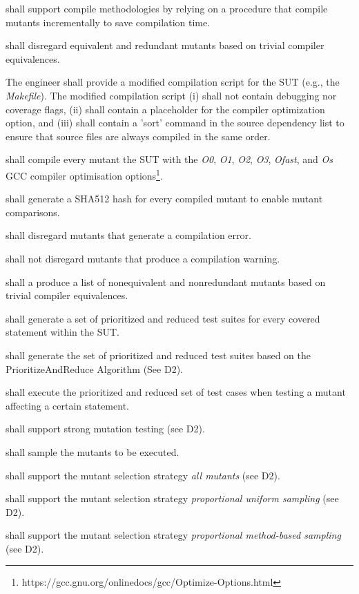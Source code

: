 \RQ{} \FAQAS shall support compile methodologies by relying on a procedure that compile mutants incrementally to save compilation time.

\RQ{} \FAQAS shall disregard equivalent and redundant mutants based on trivial compiler equivalences.

\RQ{} The engineer shall provide a modified compilation script for the SUT (e.g., the \emph{Makefile}). The modified compilation script (i) shall not contain debugging nor coverage flags, (ii) shall contain a placeholder for the compiler optimization option, and (iii) shall contain a 'sort' command in the source dependency list to ensure that source files are always compiled in the same order.

\RQ{} \FAQAS shall compile every mutant the SUT with the \textit{O0}, \textit{O1}, \textit{O2}, \textit{O3}, \textit{Ofast}, and \textit{Os} GCC compiler optimisation options\footnote{https://gcc.gnu.org/onlinedocs/gcc/Optimize-Options.html}.

\RQ{} \FAQAS shall generate a SHA512 hash for every compiled mutant to enable mutant comparisons. 

\RQ{} \FAQAS shall disregard mutants that generate a compilation error.

\RQ{} \FAQAS shall not disregard mutants that produce a compilation warning.

\RQ{} \FAQAS shall a produce a list of nonequivalent and nonredundant mutants based on trivial compiler equivalences. 

\RQ{} \FAQAS shall generate a set of prioritized and reduced test suites for every covered statement within the SUT.

\RQ{} \FAQAS shall generate the set of prioritized and reduced test suites based on the PrioritizeAndReduce Algorithm (See D2).

\RQ{} \FAQAS shall execute the prioritized and reduced set of test cases when testing a mutant affecting a certain statement.

\RQ{} \FAQAS shall support strong mutation testing (see D2).

\RQ{} \FAQAS shall sample the mutants to be executed.

\RQ{} \FAQAS shall support the mutant selection strategy \textit{all mutants} (see D2).

\RQ{} \FAQAS shall support the mutant selection strategy \textit{proportional uniform sampling} (see D2).

\RQ{} \FAQAS shall support the mutant selection strategy \textit{proportional method-based sampling} (see D2).

